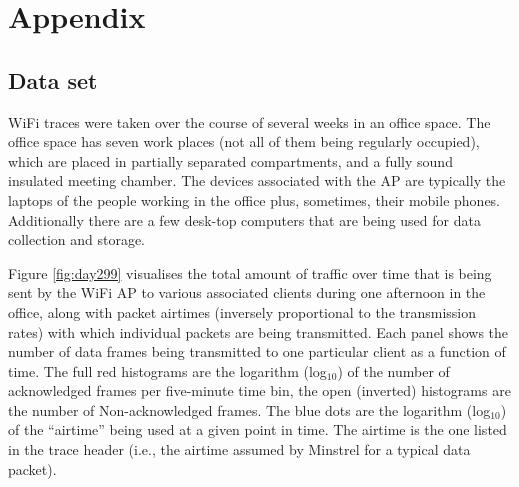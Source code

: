 \chapter{Appendix}
\label{chap:appendix}

\section{Data set}
\label{sec:data_set}
WiFi traces were taken over the	course of several weeks in an office space.
The office space has seven work places (not all of them being regularly occupied), which are placed in partially separated compartments, and a fully sound insulated meeting chamber.
The devices associated with the AP are typically the laptops of the people working in the office plus, sometimes, their mobile phones. Additionally there are a few desk-top computers that are being used for data collection and storage.

Figure \ref{fig:day299} visualises the total amount of traffic over time that is being sent by the WiFi AP to various associated clients
  during one afternoon in the office, along with packet airtimes (inversely proportional to the transmission rates) 
  with which individual packets are being transmitted.
  Each panel shows the number of data frames being transmitted to one particular client as a function of time.
  The full red histograms are the logarithm ({\sf log$_{10}$}) of the number of acknowledged frames per five-minute time bin,
  the open (inverted) histograms are the number of Non-acknowledged frames. The blue dots are the logarithm ({\sf log$_{10}$}) of the
  “airtime” being used at a given point in time. The airtime is the one listed in the trace header
  (i.e., the airtime  assumed by Minstrel for a typical data packet).


